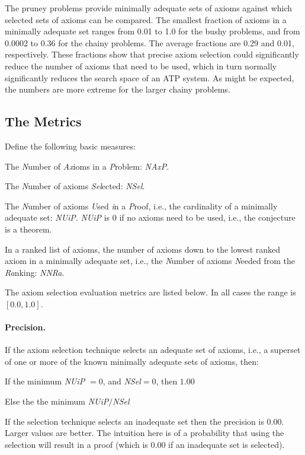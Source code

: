 \documentclass[EPiC]{easychair}
\newenvironment{packed_itemize}{
\vspace*{-0.5em}
\begin{itemize}
  \setlength{\partopsep}{0pt}
  \setlength{\itemsep}{1pt}
  \setlength{\parskip}{0pt}
  \setlength{\parsep}{0pt}
}{\end{itemize}}
\begin{document}
The pruney problems provide minimally adequate sets of axioms against which
selected sets of axioms can be compared.
The smallest fraction of axioms in a minimally adequate set ranges from 
0.01 to 1.0 for the bushy problems, and from 0.0002 to 0.36 for the chainy 
problems.
The average fractions are 0.29 and 0.01, respectively.
These fractions show that precise axiom selection could significantly reduce 
the number of axioms that need to be used, which in turn normally 
significantly reduces the search space of an ATP system.
As might be expected, the numbers are more extreme for the larger chainy 
problems.

\subsection{The Metrics}
\label{TheMetrics}

Define the following basic measures:
\begin{packed_itemize}
\item The \emph{N}umber of \emph{Ax}ioms in a \emph{P}roblem: \emph{NAxP}.
\item The \emph{N}umber of axioms \emph{Sel}ected: \emph{NSel}.
\item The \emph{N}umber of axioms \emph{U}sed \emph{i}n a \emph{P}roof, 
      i.e., the cardinality of a minimally adequate set: \emph{NUiP}.
      \emph{NUiP} is $0$ if no axioms need to be used, i.e., the conjecture 
      is a theorem.
\item In a ranked list of axioms, the number of axioms down to the lowest 
      ranked axiom in a minimally adequate set, i.e., the \emph{N}umber 
      of axioms \emph{N}eeded from the \emph{Ra}nking: \emph{NNRa}.
\end{packed_itemize}

The axiom selection evaluation metrics are listed below.
In all cases the range is $[0.0,1.0]$.

\paragraph{Precision.}
If the axiom selection technique selects an adequate set of axioms, i.e., a 
superset of one or more of the known minimally adequate sets of axioms, then:
\begin{packed_itemize}
\item If the minimum \emph{NUiP} $= 0$, and \emph{NSel}$ = 0$, then $1.00$
\item Else the the minimum \emph{NUiP}$/$\emph{NSel} 
\end{packed_itemize}
If the selection technique selects an inadequate set then the precision
is $0.00$.
Larger values are better.
The intuition here is of a probability that using the selection will result
in a proof (which is $0.00$ if an inadequate set is selected).
\end{document}

